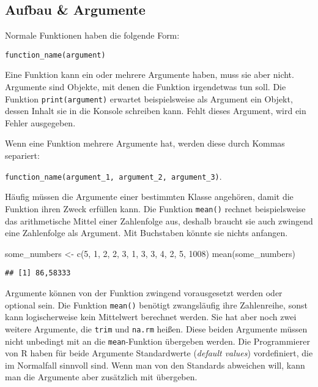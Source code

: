 \documentclass[
]{book}
\newenvironment{Shaded}{\begin{snugshade}}{\end{snugshade}}
\newcommand{\DecValTok}[1]{\textcolor[rgb]{0.00,0.00,0.81}{#1}}
\newcommand{\FunctionTok}[1]{\textcolor[rgb]{0.00,0.00,0.00}{#1}}
\newcommand{\NormalTok}[1]{#1}
\newcommand{\OtherTok}[1]{\textcolor[rgb]{0.56,0.35,0.01}{#1}}
\begin{document}
\hypertarget{aufbau-argumente}{%
\subsection{Aufbau \& Argumente}\label{aufbau-argumente}}

Normale Funktionen haben die folgende Form:

\texttt{function\_name(argument)}

Eine Funktion kann ein oder mehrere Argumente haben, muss sie aber nicht. Argumente sind Objekte, mit denen die Funktion irgendetwas tun soll. Die Funktion \texttt{print(argument)} erwartet beispielsweise als Argument ein Objekt, dessen Inhalt sie in die Konsole schreiben kann. Fehlt dieses Argument, wird ein Fehler ausgegeben.

Wenn eine Funktion mehrere Argumente hat, werden diese durch Kommas separiert:

\texttt{function\_name(argument\_1,\ argument\_2,\ argument\_3)}.

Häufig müssen die Argumente einer bestimmten Klasse angehören, damit die Funktion ihren Zweck erfüllen kann. Die Funktion \texttt{mean()} rechnet beispielsweise das arithmetische Mittel einer Zahlenfolge aus, deshalb braucht sie auch zwingend eine Zahlenfolge als Argument. Mit Buchstaben könnte sie nichts anfangen.

\begin{Shaded}
\begin{Highlighting}[]
\NormalTok{some\_numbers }\OtherTok{\textless{}{-}} \FunctionTok{c}\NormalTok{(}\DecValTok{5}\NormalTok{, }\DecValTok{1}\NormalTok{, }\DecValTok{2}\NormalTok{, }\DecValTok{2}\NormalTok{, }\DecValTok{3}\NormalTok{, }\DecValTok{1}\NormalTok{, }\DecValTok{3}\NormalTok{, }\DecValTok{3}\NormalTok{, }\DecValTok{4}\NormalTok{, }\DecValTok{2}\NormalTok{, }\DecValTok{5}\NormalTok{, }\DecValTok{1008}\NormalTok{)}
\FunctionTok{mean}\NormalTok{(some\_numbers)}
\end{Highlighting}
\end{Shaded}

\begin{verbatim}
## [1] 86,58333
\end{verbatim}

Argumente können von der Funktion zwingend vorausgesetzt werden oder optional sein. Die Funktion \texttt{mean()} benötigt zwangsläufig ihre Zahlenreihe, sonst kann logischerweise kein Mittelwert berechnet werden. Sie hat aber noch zwei weitere Argumente, die \texttt{trim} und \texttt{na.rm} heißen. Diese beiden Argumente müssen nicht unbedingt mit an die \texttt{mean}-Funktion übergeben werden. Die Programmierer von R haben für beide Argumente Standardwerte (\emph{default values}) vordefiniert, die im Normalfall sinnvoll sind. Wenn man von den Standards abweichen will, kann man die Argumente aber zusätzlich mit übergeben.
\end{document}
